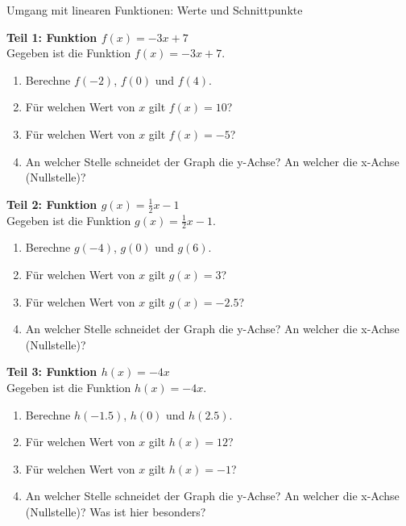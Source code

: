 \begin{aufgabenumgebung}{Umgang mit linearen Funktionen: Werte und Schnittpunkte}

\textbf{Teil 1: Funktion $f(x) = -3x + 7$} \\
Gegeben ist die Funktion $f(x) = -3x + 7$.
\begin{enumerate}[label=(\alph*)]
    \item Berechne $f(-2)$, $f(0)$ und $f(4)$.
    \item Für welchen Wert von $x$ gilt $f(x) = 10$?
    \item Für welchen Wert von $x$ gilt $f(x) = -5$?
    \item An welcher Stelle schneidet der Graph die y-Achse? An welcher die x-Achse (Nullstelle)?
\end{enumerate}

\bigskip %

\textbf{Teil 2: Funktion $g(x) = \frac{1}{2}x - 1$} \\
Gegeben ist die Funktion $g(x) = \frac{1}{2}x - 1$.
\begin{enumerate}[label=(\alph*)]
    \item Berechne $g(-4)$, $g(0)$ und $g(6)$.
    \item Für welchen Wert von $x$ gilt $g(x) = 3$?
    \item Für welchen Wert von $x$ gilt $g(x) = -2.5$?
    \item An welcher Stelle schneidet der Graph die y-Achse? An welcher die x-Achse (Nullstelle)?
\end{enumerate}

\bigskip %

\textbf{Teil 3: Funktion $h(x) = -4x$} \\
Gegeben ist die Funktion $h(x) = -4x$.
\begin{enumerate}[label=(\alph*)]
    \item Berechne $h(-1.5)$, $h(0)$ und $h(2.5)$.
    \item Für welchen Wert von $x$ gilt $h(x) = 12$?
    \item Für welchen Wert von $x$ gilt $h(x) = -1$?
    \item An welcher Stelle schneidet der Graph die y-Achse? An welcher die x-Achse (Nullstelle)? Was ist hier besonders?
\end{enumerate}
\end{aufgabenumgebung}


